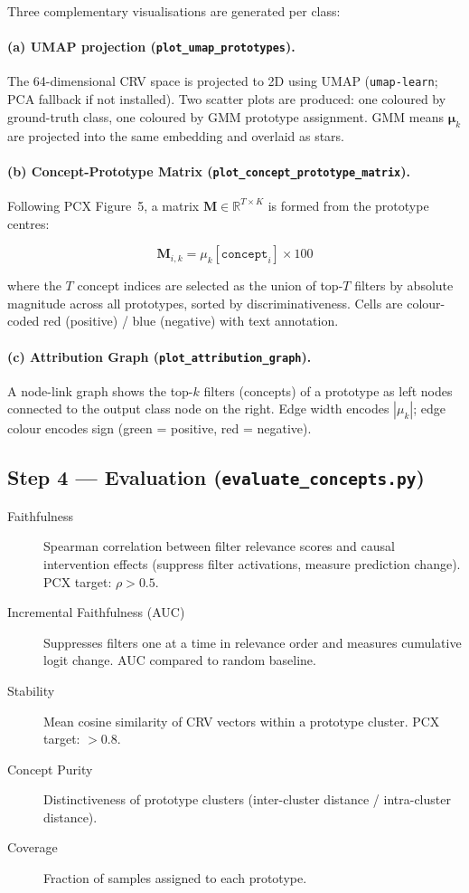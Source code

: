 \documentclass[11pt,a4paper]{article}
\begin{document}
Three complementary visualisations are generated per class:

\paragraph{(a) UMAP projection (\texttt{plot\_umap\_prototypes}).}
The 64-dimensional CRV space is projected to 2D using UMAP
(\texttt{umap-learn}; PCA fallback if not installed).  Two scatter plots are
produced: one coloured by ground-truth class, one coloured by GMM prototype
assignment.  GMM means $\boldsymbol{\mu}_k$ are projected into the same
embedding and overlaid as stars.

\paragraph{(b) Concept-Prototype Matrix (\texttt{plot\_concept\_prototype\_matrix}).}
Following PCX Figure~5, a matrix $\mathbf{M} \in \mathbb{R}^{T \times K}$ is
formed from the prototype centres:

\begin{equation}
  \mathbf{M}_{i,k} = \mu_k[\mathtt{concept}_i] \times 100
\end{equation}

where the $T$ concept indices are selected as the union of top-$T$ filters by
absolute magnitude across all prototypes, sorted by discriminativeness.  Cells
are colour-coded red (positive) / blue (negative) with text annotation.

\paragraph{(c) Attribution Graph (\texttt{plot\_attribution\_graph}).}
A node-link graph shows the top-$k$ filters (concepts) of a prototype as left
nodes connected to the output class node on the right.  Edge width encodes
$|\mu_k|$; edge colour encodes sign (green = positive, red = negative).

\subsection{Step 4 — Evaluation (\texttt{evaluate\_concepts.py})}

\begin{description}
  \item[Faithfulness] Spearman correlation between filter relevance scores and
        causal intervention effects (suppress filter activations, measure
        prediction change).  PCX target: $\rho > 0.5$.
  \item[Incremental Faithfulness (AUC)] Suppresses filters one at a time in
        relevance order and measures cumulative logit change.  AUC compared to
        random baseline.
  \item[Stability] Mean cosine similarity of CRV vectors within a prototype
        cluster.  PCX target: $> 0.8$.
  \item[Concept Purity] Distinctiveness of prototype clusters (inter-cluster
        distance / intra-cluster distance).
  \item[Coverage] Fraction of samples assigned to each prototype.
\end{description}
\end{document}
